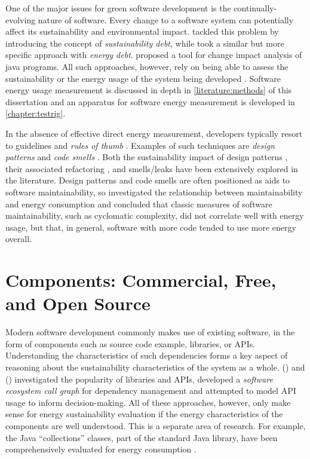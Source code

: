 \label{A65}
One of the major issues for green software development is the continually-evolving nature of software. Every change to a software system can potentially affect its sustainability and environmental impact. \citet{Betz2015} tackled this problem by introducing the concept of \emph{sustainability debt}, while \citet{Couto2020} took a similar but more specific approach with \emph{energy debt}. \citet{Ren2004} proposed a tool for change impact analysis of java programs. All such approaches, however, rely on being able to assess the sustainability or the energy usage of the system being developed \citep{Jagroep2016}. Software energy usage measurement is discussed in depth in \autoref{literature:methods} of this dissertation and an apparatus for software energy measurement is developed in \autoref{chapter:testrig}.

In the absence of effective direct energy measurement, developers typically resort to guidelines and \emph{rules of thumb} \citep{Aggarwal2015}. Examples of such techniques are \emph{design patterns} \citep{Gamma1994} and \emph{code smells} \citep{Fowler1999}. Both the sustainability impact of design patterns \citep{Sahin2012} \citep{Noureddine2015a} \citep{Litke2005}, their associated refactoring \citep{daSilva2010} \citep{Sahin2014}, and smells/leaks \citep{Gottschalk2012} \citep{Palomba2019} \citep{Pereira2020} \citep{Vetro2013} have been extensively explored in the literature. Design patterns and code smells are often positioned as aids to software maintainability, so \citet{Mancebo2021} investigated the relationship between maintainability and energy consumption and concluded that classic measures of software maintainability, such as cyclomatic complexity, did not correlate well with energy usage, but that, in general, software with more code tended to use more energy overall.

\section{Components: Commercial, Free, and Open Source}
\label{literature:components}

Modern software development commonly makes use of existing software, in the form of components such as source code example, libraries, or APIs. Understanding the characteristics of such dependencies forms a key aspect of reasoning about the sustainability characteristics of the system as a whole. \citeauthor{Mileva2010} (\citeyear{Mileva2009}) and (\citeyear{Mileva2010}) investigated the popularity of libraries and APIs, \citet{Hejderup2018} developed a \emph{software ecosystem call graph} for dependency management and \citet{Bauer2012a} attempted to model API usage to inform decision-making. All of these approaches, however, only make sense for energy sustainability evaluation if the energy characteristics of the components are well understood. This is a separate area of research. For example, the Java \enquote{collections} classes, part of the standard Java library, have been comprehensively evaluated for energy consumption \citep{Hasan2016} \citep{Pereira2016} \citep{Pinto2016}.

